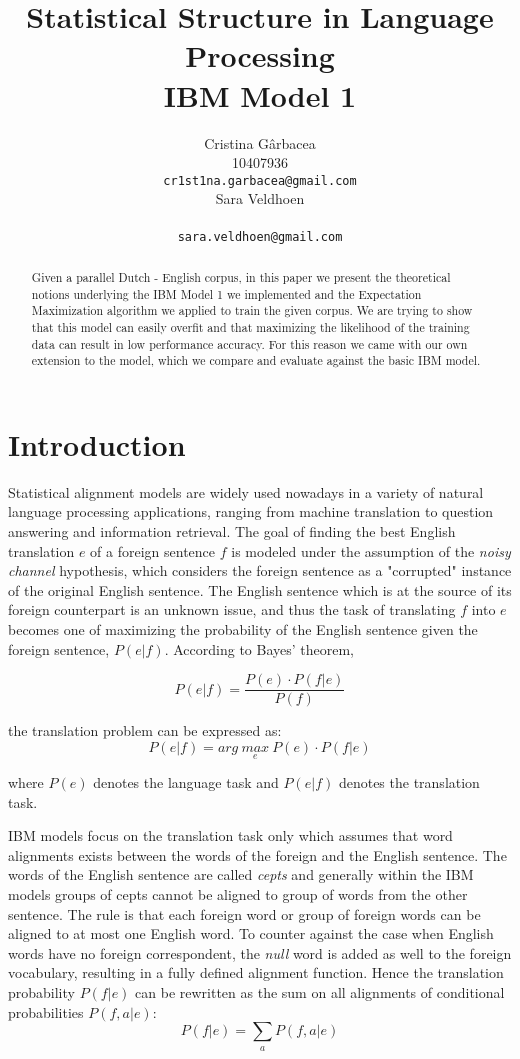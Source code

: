 \documentclass[11pt]{article}
\title{Statistical Structure in Language Processing \\ IBM Model 1}
\author{ Cristina G\^arbacea\\
  10407936 \\
  {\tt cr1st1na.garbacea@gmail.com} 
  \\\And
  Sara Veldhoen \\
   \\
  {\tt sara.veldhoen@gmail.com} \\}
\date{}
\begin{document}
\maketitle

\begin{abstract}
Given a parallel Dutch - English corpus, in this paper we present the theoretical notions underlying the IBM Model 1 we implemented and the Expectation Maximization algorithm we applied to train the given corpus. We are trying to show that this model can easily overfit and that maximizing the likelihood of the training data can result in low performance accuracy. For this reason we came with our own extension to the model, which we compare and evaluate against the basic IBM model. 
\end{abstract}

\section{Introduction}
Statistical alignment models are widely used nowadays in a variety of natural language processing applications, ranging from machine translation to question answering and information retrieval. The goal of finding the best English translation $e$ of a foreign sentence $f$ is modeled under the assumption of the \textit{noisy channel} hypothesis, which considers the foreign sentence as a "corrupted" instance of the original English sentence. The English sentence which is at the source of its foreign counterpart is an unknown issue, and thus the task of translating $f$ into $e$ becomes one of maximizing the probability of the English sentence given the foreign sentence, $P(e|f)$. According to Bayes' theorem, 

\begin{equation}
P(e|f)= \frac{P(e)\cdot P(f|e)}{P(f)}
\end{equation}

the translation problem can be expressed as:
\begin{equation}
P(e|f)= arg \ \underset{e}{max} \ P(e)\cdot P(f|e)
\end{equation}

where $P(e)$ denotes the language task and $P(e|f)$ denotes the translation task. 

IBM models focus on the translation task only which assumes that word alignments exists between the words of the foreign and the English sentence. The words of the English sentence are called \textit{cepts} and generally within the IBM models groups of cepts cannot be aligned to group of words from the other sentence. The rule is that each foreign word or group of foreign words can be aligned to at most one English word. To counter against the case when English words have no foreign correspondent, the \textit{null} word is added as well to the foreign vocabulary, resulting in a fully defined alignment function. Hence the translation probability $P(f|e)$ can be rewritten as the sum on all alignments of conditional probabilities $P(f, a|e)$:
\begin{equation}
P(f|e) = \sum_a P(f,a|e)
\end{equation}
\end{document}
